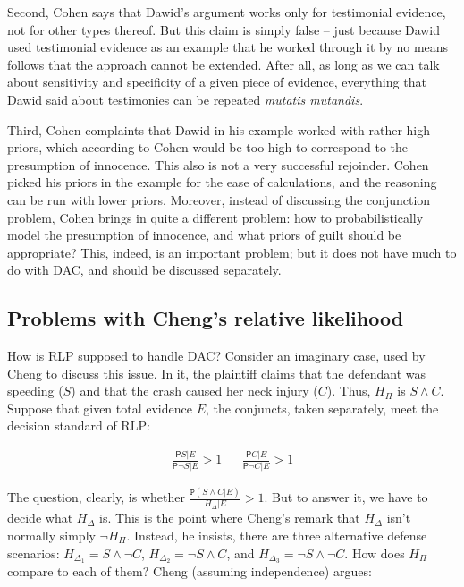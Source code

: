 \documentclass[10pt,dvipsnames,enabledeprecatedfontcommands]{scrartcl}
\newcommand{\n}{\neg}
\newcommand{\et}{\wedge}
\newcommand{\pr}{\mathsf{P}}
\begin{document}
Second, Cohen says that Dawid's argument works only for testimonial
evidence, not for other types thereof. But this claim is simply false --
just because Dawid used testimonial evidence as an example that he
worked through it by no means follows that the approach cannot be
extended. After all, as long as we can talk about sensitivity and
specificity of a given piece of evidence, everything that Dawid said
about testimonies can be repeated \emph{mutatis mutandis}.

Third, Cohen complaints that Dawid in his example worked with rather
high priors, which according to Cohen would be too high to correspond to
the presumption of innocence. This also is not a very successful
rejoinder. Cohen picked his priors in the example for the ease of
calculations, and the reasoning can be run with lower priors. Moreover,
instead of discussing the conjunction problem, Cohen brings in quite a
different problem: how to probabilistically model the presumption of
innocence, and what priors of guilt should be appropriate? This, indeed,
is an important problem; but it does not have much to do with DAC, and
should be discussed separately.

\subsection{Problems with Cheng's relative
likelihood}\label{problems-with-chengs-relative-likelihood}

How is RLP supposed to handle DAC? Consider an imaginary case, used by
Cheng to discuss this issue. In it, the plaintiff claims that the
defendant was speeding (\(S\)) and that the crash caused her neck injury
(\(C\)). Thus, \(H_\Pi\) is \(S\et C\). Suppose that given total
evidence \(E\), the conjuncts, taken separately, meet the decision
standard of RLP:

\begin{align}
 \nonumber 
 \frac{\pr{S\vert E}}{\pr{\n S \vert E}} > 1   & & \frac{\pr{C\vert E}}{\pr{\n C \vert E}} > 1
\end{align}

\noindent The question, clearly, is whether
\(\frac{\mathtt{P}(S\et C\vert E)}{H_\Delta \vert E}>1\). But to answer
it, we have to decide what \(H_\Delta\) is. This is the point where
Cheng's remark that \(H_\Delta\) isn't normally simply \(\n H_\Pi\).
Instead, he insists, there are three alternative defense scenarios:
\(H_{\Delta_1}= S\et \n C\), \(H_{\Delta_2}=\n S \et C\), and
\(H_{\Delta_3}=\n S \et \n C\). How does \(H_\Pi\) compare to each of
them? Cheng (assuming independence) argues:
\end{document}
